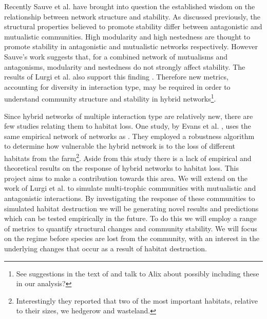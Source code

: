 \documentclass[12pt]{article}
\begin{document}
Recently Sauve et al. \cite{sauve2014structure} have brought into question the established wisdom on the relationship between network structure and stability. As discussed previously, the structural properties believed to promote stability differ between antagonistic and mutualistic communities. High modularity and high nestedness are thought to promote stability in antagonistic and mutualistic networks respectively. However Sauve's work suggests that, for a combined network of mutualisms and antagonisms, modularity and nestedness do not strongly affect stability. The results of Lurgi et al. also support this finding \cite{lurgi2015effects}. Therefore new metrics, accounting for diversity in interaction type, may be required in order to understand community structure and stability in hybrid networks\footnote{See suggestions in the text of \cite{sauve2014structure} and talk to Alix about possibly including these in our analysis?}.

Since hybrid networks of multiple interaction type are relatively new, there are few studies relating them to habitat loss. One study, by Evans et al. \cite{evans2013robustness}, uses the same empirical network of networks as \cite{pocock2012robustness}. They employed a robustness algorithm to determine how vulnerable the hybrid network is to the loss of different habitats from the farm\footnote{Interestingly they reported that two of the most important habitats, relative to their sizes, we hedgerow and wasteland.}. Aside from this study there is a lack of empirical and theoretical results on the response of hybrid networks to habitat loss. This project aims to make a contribution towards this area. We will extend on the work of Lurgi et al. \cite{lurgi2015effects} to simulate multi-trophic communities with mutualistic and antagonistic interactions. By investigating the response of these communities to simulated habitat destruction we will be generating novel results and predictions which can be tested empirically in the future. To do this we will employ a range of metrics to quantify structural changes and community stability. We will focus on the regime before species are lost from the community, with an interest in the underlying changes that occur as a result of habitat destruction.

\end{document}
